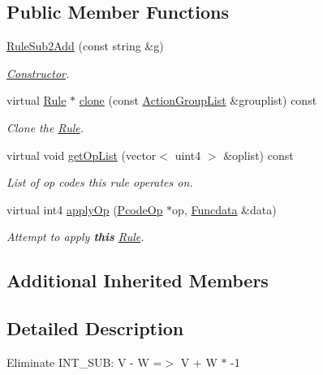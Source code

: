 \subsection*{Public Member Functions}
\begin{DoxyCompactItemize}
\item 
\mbox{\hyperlink{class_rule_sub2_add_a19f042c66f4258a0dc1c5f1ef8fea727}{Rule\+Sub2\+Add}} (const string \&g)
\begin{DoxyCompactList}\small\item\em \mbox{\hyperlink{class_constructor}{Constructor}}. \end{DoxyCompactList}\item 
virtual \mbox{\hyperlink{class_rule}{Rule}} $\ast$ \mbox{\hyperlink{class_rule_sub2_add_a2dba60f5a3f711b7320adda2b9f8f92e}{clone}} (const \mbox{\hyperlink{class_action_group_list}{Action\+Group\+List}} \&grouplist) const
\begin{DoxyCompactList}\small\item\em Clone the \mbox{\hyperlink{class_rule}{Rule}}. \end{DoxyCompactList}\item 
virtual void \mbox{\hyperlink{class_rule_sub2_add_af7b85d76a9ca080c7236c5842d4b699b}{get\+Op\+List}} (vector$<$ uint4 $>$ \&oplist) const
\begin{DoxyCompactList}\small\item\em List of op codes this rule operates on. \end{DoxyCompactList}\item 
virtual int4 \mbox{\hyperlink{class_rule_sub2_add_adb3ba6d1c2c81fe6bc441ca0e4882e6a}{apply\+Op}} (\mbox{\hyperlink{class_pcode_op}{Pcode\+Op}} $\ast$op, \mbox{\hyperlink{class_funcdata}{Funcdata}} \&data)
\begin{DoxyCompactList}\small\item\em Attempt to apply {\bfseries{this}} \mbox{\hyperlink{class_rule}{Rule}}. \end{DoxyCompactList}\end{DoxyCompactItemize}
\subsection*{Additional Inherited Members}


\subsection{Detailed Description}
Eliminate I\+N\+T\+\_\+\+S\+UB\+: {\ttfamily V -\/ W =$>$ V + W $\ast$ -\/1} 

